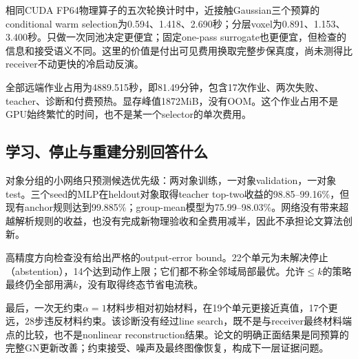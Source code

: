 相同CUDA FP64物理算子的五次轮换计时中，近接触Gaussian三个预算的conditional warm selection为0.594、1.418、2.690秒；分层voxel为0.891、1.153、3.400秒。只做一次同池决定更便宜；固定one-pass surrogate也更便宜，但检查的信息和接受语义不同。这里的价值是付出可见费用换取完整步保真度，尚未测得比receiver不动更快的冷启动反演。

全部远端作业占用为4889.515秒，即81.49分钟，包含17次作业、两次失败、teacher、诊断和付费预热。显存峰值1872MiB，没有OOM。这个作业占用不是GPU始终繁忙的时间，也不是某一个selector的单次费用。

\subsection{学习、停止与重建分别回答什么}
对象分组的小网络只预测候选优先级：两对象训练，一对象validation，一对象test。三个seed的MLP在heldout对象取得teacher top-two收益的98.85--99.16\%，但现有anchor规则达到99.885\%；group-mean模型为75.99--98.03\%。网络没有带来超越解析规则的收益，也没有完成新物理验收和全费用减半，因此不承担论文算法创新。

高精度方向检查没有给出严格的output-error bound。22个单元为未解决停止（abstention），14个达到动作上限；它们都不称全邻域局部最优。允许$\le k$的策略最终仍全部用满$k$，没有取得终态节省电流秩。

最后，一次无约束$\alpha=1$材料步相对初始材料，在19个单元更接近真值，17个更远，28步违反材料约束。该诊断没有经过line search，既不是与receiver最终材料端点的比较，也不是nonlinear reconstruction结果。论文的明确正面结果是同预算的完整GN更新改善；约束接受、噪声及最终图像恢复，构成下一层证据问题。
